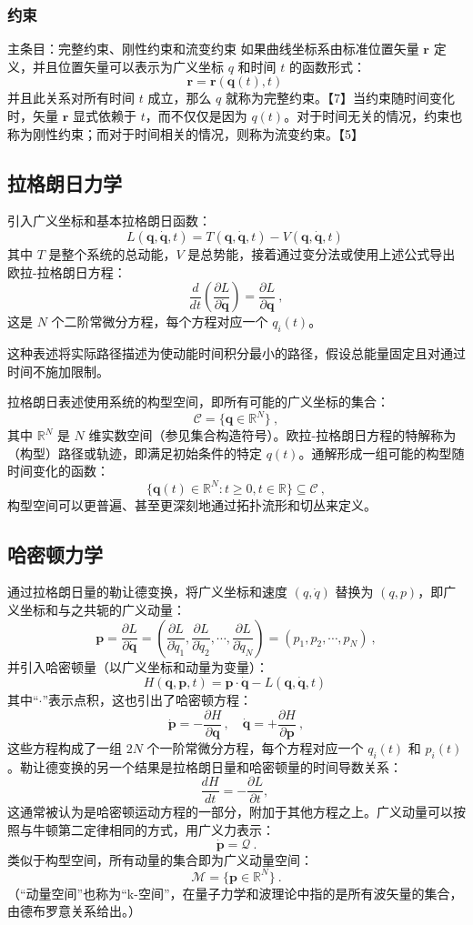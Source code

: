 \subsubsection{约束}  
主条目：完整约束、刚性约束和流变约束  
如果曲线坐标系由标准位置矢量 \( \mathbf{r} \) 定义，并且位置矢量可以表示为广义坐标 \( q \) 和时间 \( t \) 的函数形式：
\[
\mathbf{r} = \mathbf{r} (\mathbf{q} (t), t)~
\]
并且此关系对所有时间 \( t \) 成立，那么 \( q \) 就称为完整约束。【7】当约束随时间变化时，矢量 \( \mathbf{r} \) 显式依赖于 \( t \)，而不仅仅是因为 \( q(t) \)。对于时间无关的情况，约束也称为刚性约束；而对于时间相关的情况，则称为流变约束。【5】
\subsection{拉格朗日力学} 
引入广义坐标和基本拉格朗日函数：
\[
L(\mathbf{q}, \mathbf{\dot{q}}, t) = T(\mathbf{q}, \mathbf{\dot{q}}, t) - V(\mathbf{q}, \mathbf{\dot{q}}, t)~
\]
其中 \( T \) 是整个系统的总动能，\( V \) 是总势能，接着通过变分法或使用上述公式导出欧拉-拉格朗日方程：
\[
\frac{d}{dt} \left( \frac{\partial L}{\partial \mathbf{\dot{q}}} \right) = \frac{\partial L}{\partial \mathbf{q}} ~,
\]
这是 \( N \) 个二阶常微分方程，每个方程对应一个 \( q_i(t) \)。

这种表述将实际路径描述为使动能时间积分最小的路径，假设总能量固定且对通过时间不施加限制。

拉格朗日表述使用系统的构型空间，即所有可能的广义坐标的集合：
\[
\mathcal{C} = \{ \mathbf{q} \in \mathbb{R}^N \} ~,
\]
其中 \( \mathbb{R}^N \) 是 \( N \) 维实数空间（参见集合构造符号）。欧拉-拉格朗日方程的特解称为（构型）路径或轨迹，即满足初始条件的特定 \( q(t) \)。通解形成一组可能的构型随时间变化的函数：
\[
\{ \mathbf{q}(t) \in \mathbb{R}^N : t \geq 0, t \in \mathbb{R} \} \subseteq \mathcal{C} ~,
\]
构型空间可以更普遍、甚至更深刻地通过拓扑流形和切丛来定义。
\subsection{哈密顿力学}    
通过拉格朗日量的勒让德变换，将广义坐标和速度 \((q, \dot{q})\) 替换为 \((q, p)\)，即广义坐标和与之共轭的广义动量：
\[
\mathbf{p} = \frac{\partial L}{\partial \mathbf{\dot{q}}} = \left( \frac{\partial L}{\partial \dot{q}_1}, \frac{\partial L}{\partial \dot{q}_2}, \cdots, \frac{\partial L}{\partial \dot{q}_N} \right) = (p_1, p_2, \cdots, p_N) ~,
\]
并引入哈密顿量（以广义坐标和动量为变量）：
\[
H(\mathbf{q}, \mathbf{p}, t) = \mathbf{p} \cdot \mathbf{\dot{q}} - L(\mathbf{q}, \mathbf{\dot{q}}, t)~
\]
其中“\(\cdot\)”表示点积，这也引出了哈密顿方程：
\[
\dot{\mathbf{p}} = -\frac{\partial H}{\partial \mathbf{q}} \,, \quad \dot{\mathbf{q}} = +\frac{\partial H}{\partial \mathbf{p}} ~,
\]
这些方程构成了一组 \(2N\) 个一阶常微分方程，每个方程对应一个 \( q_i(t) \) 和 \( p_i(t) \)。勒让德变换的另一个结果是拉格朗日量和哈密顿量的时间导数关系：
\[
\frac{dH}{dt} = -\frac{\partial L}{\partial t} ,~
\]
这通常被认为是哈密顿运动方程的一部分，附加于其他方程之上。广义动量可以按照与牛顿第二定律相同的方式，用广义力表示：
\[
\dot{\mathbf{p}} = \boldsymbol{\mathcal{Q}} ~.
\]
类似于构型空间，所有动量的集合即为广义动量空间：
\[
\mathcal{M} = \{ \mathbf{p} \in \mathbb{R}^N \} ~.
\]
（“动量空间”也称为“k-空间”，在量子力学和波理论中指的是所有波矢量的集合，由德布罗意关系给出。）

